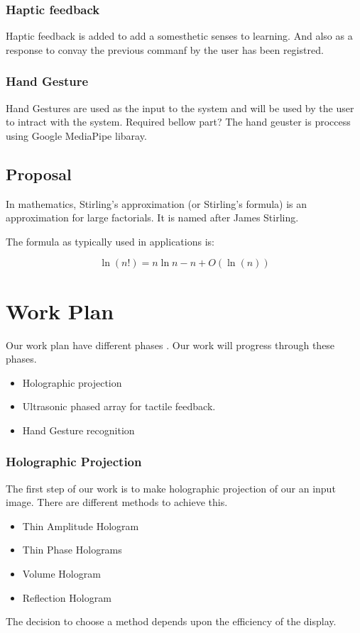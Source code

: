 \documentclass{fisatproject}
\begin{document}
\subsection{Haptic feedback}
Haptic feedback is added to add a somesthetic senses to learning. And also as a response to convay the previous commanf by the user has been registred.

\subsection{Hand Gesture}
Hand Gestures are used as the input to the system and will be used by the user to intract with the system.
{Required bellow part?}
The hand geuster is proccess using Google  MediaPipe libaray.

\section{Proposal}
In mathematics, Stirling's approximation (or Stirling's formula) is an approximation for large factorials. It is named after James Stirling.

The formula as typically used in applications is:

$$
\ln (n!) = n \ln n - n  + O(\ln(n))
$$

\chapter{Work Plan}
Our work plan have different phases .
 Our work will progress through these phases.
 \begin{itemize}
     \item Holographic projection
     \item Ultrasonic phased array for tactile feedback.
     \item Hand Gesture recognition
 \end{itemize}
 \subsection{Holographic Projection}
    The first step of our work is to make holographic projection of our an input image.
    There are different methods to achieve this.
    \begin{itemize}
        \item Thin Amplitude Hologram
        \item Thin Phase Holograms
        \item Volume Hologram
        \item Reflection Hologram
    \end{itemize}
    The decision to choose a method depends upon the efficiency of the display.
\end{document}

